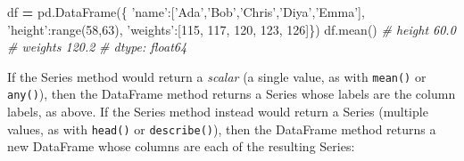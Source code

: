\documentclass[]{book}
\newenvironment{Shaded}{\begin{snugshade}}{\end{snugshade}}
\newcommand{\DecValTok}[1]{\textcolor[rgb]{0.00,0.00,0.81}{#1}}
\newcommand{\StringTok}[1]{\textcolor[rgb]{0.31,0.60,0.02}{#1}}
\newcommand{\CommentTok}[1]{\textcolor[rgb]{0.56,0.35,0.01}{\textit{#1}}}
\newcommand{\OperatorTok}[1]{\textcolor[rgb]{0.81,0.36,0.00}{\textbf{#1}}}
\newcommand{\BuiltInTok}[1]{#1}
\newcommand{\NormalTok}[1]{#1}
\begin{document}
\begin{Shaded}
\begin{Highlighting}[]
\NormalTok{df }\OperatorTok{=}\NormalTok{ pd.DataFrame(\{}
    \StringTok{'name'}\NormalTok{:[}\StringTok{'Ada'}\NormalTok{,}\StringTok{'Bob'}\NormalTok{,}\StringTok{'Chris'}\NormalTok{,}\StringTok{'Diya'}\NormalTok{,}\StringTok{'Emma'}\NormalTok{],}
    \StringTok{'height'}\NormalTok{:}\BuiltInTok{range}\NormalTok{(}\DecValTok{58}\NormalTok{,}\DecValTok{63}\NormalTok{),}
    \StringTok{'weights'}\NormalTok{:[}\DecValTok{115}\NormalTok{, }\DecValTok{117}\NormalTok{, }\DecValTok{120}\NormalTok{, }\DecValTok{123}\NormalTok{, }\DecValTok{126}\NormalTok{]\})}
\NormalTok{df.mean()}
    \CommentTok{# height      60.0}
    \CommentTok{# weights    120.2}
    \CommentTok{# dtype: float64}
\end{Highlighting}
\end{Shaded}

If the Series method would return a \emph{scalar} (a single value, as
with \texttt{mean()} or \texttt{any()}), then the DataFrame method
returns a Series whose labels are the column labels, as above. If the
Series method instead would return a Series (multiple values, as with
\texttt{head()} or \texttt{describe()}), then the DataFrame method
returns a new DataFrame whose columns are each of the resulting Series:

\begin{Shaded}
\end{Shaded}
\end{document}
